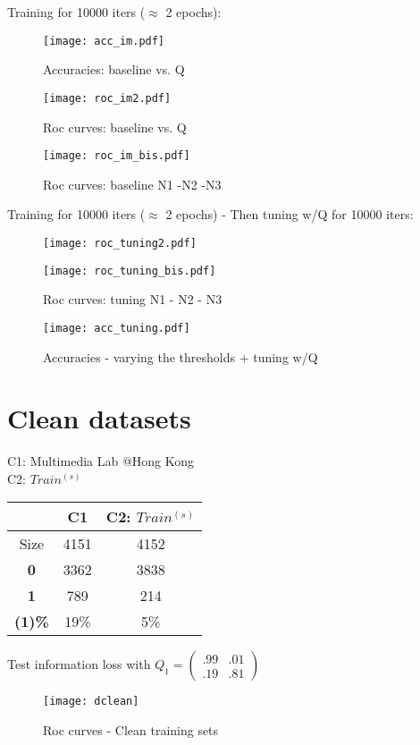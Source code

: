 \documentclass[10pt]{article}
\newcommand{\1}{\mathbbm{1}}
\newcommand{\0}{\mathbf{0}}
\begin{document}
Training for 10000 iters ($\approx$ 2 epochs):
\begin{figure}[H]
    \centering
    \texttt{[image: acc\_im.pdf]}
    \caption{Accuracies: baseline vs. Q}
\end{figure}
\begin{figure}[H]
    \centering
    \texttt{[image: roc\_im2.pdf]}
    \caption{Roc curves: baseline vs. Q}
\end{figure}
\begin{figure}[H]
    \centering
    \texttt{[image: roc\_im\_bis.pdf]}
    \caption{Roc curves: baseline N1 -N2 -N3}
\end{figure}


\newpage
Training for 10000 iters ($\approx$ 2 epochs) - Then tuning w/Q for 10000 iters:

\begin{figure}[H]
    \centering
    \texttt{[image: roc\_tuning2.pdf]}
\end{figure}
\begin{figure}[H]
    \centering
    \texttt{[image: roc\_tuning\_bis.pdf]}
    \caption{Roc curves: tuning N1 - N2 - N3}
\end{figure}

\begin{figure}[H]
    \centering
    \texttt{[image: acc\_tuning.pdf]}
    \caption{Accuracies - varying the thresholds + tuning w/Q}
\end{figure}

\section{Clean datasets}
C1: Multimedia Lab @Hong Kong\\
C2: $Train^{(s)}$
\begin{table}[H]
\centering
\begin{tabular}{|c|cc|}
\hline
           & C1   & C2: $Train^{(s)}$\\
\hline
Size       & 4151 &  4152  \\
\textbf{0} & 3362 &  3838   \\
\textbf{1} &  789 &   214   \\
\textbf{(1)\%}& 19\% & 5\%  \\
\hline
\end{tabular}
\end{table}
Test information loss with $Q_1=\begin{pmatrix}.99&.01\\.19&.81\end{pmatrix}$
\begin{figure}[H]
    \centering
    \texttt{[image: dclean]}
    \caption{Roc curves - Clean training sets}
\end{figure}
\end{document}
